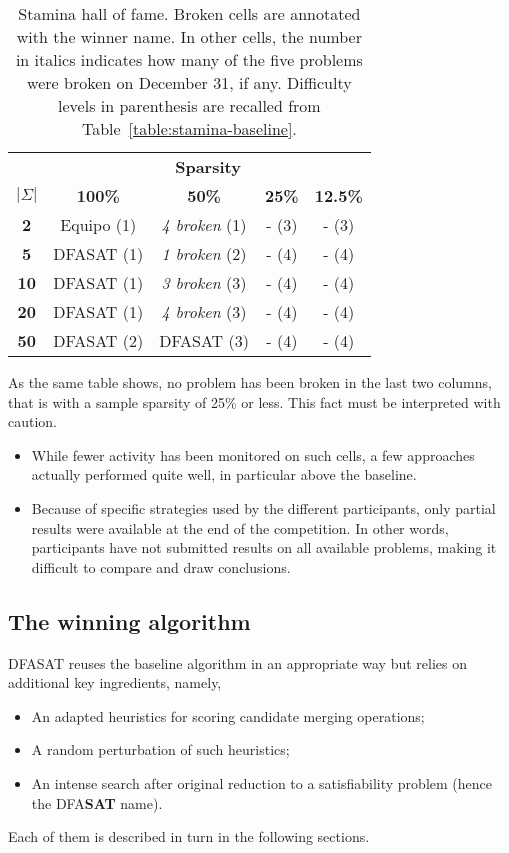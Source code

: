 \begin{table}
\begin{center}
\begin{tabular}{c|c c c c}
&\multicolumn{4}{|c}{\textbf{Sparsity}}\\ 
\textbf{$|\Sigma|$} & \textbf{100\%} & \textbf{50\%} & \textbf{25\%} & \textbf{12.5\%}\\
\hline
\textbf{2}  & Equipo (1) & \emph{4 broken} (1)  & - (3) & - (3) \\
\textbf{5}  & DFASAT (1) & \emph{1 broken} (2)  & - (4) & - (4) \\
\textbf{10} & DFASAT (1) & \emph{3 broken} (3)  & - (4) & - (4) \\
\textbf{20} & DFASAT (1) & \emph{4 broken} (3)  & - (4) & - (4) \\
\textbf{50} & DFASAT (2) & DFASAT (3) & - (4) & - (4) \\
\end{tabular}
\end{center}
\caption{Stamina hall of fame. Broken cells are annotated with the winner name. In other cells, the number in italics indicates how many of the five problems were broken on December 31, if any. Difficulty levels in parenthesis are recalled from Table~\ref{table:stamina-baseline}.\label{table:stamina-hall-of-fame}}
\end{table}

As the same table shows, no problem has been broken in the last two columns, that is with a sample sparsity of 25\% or less. This fact must be interpreted with caution. 
\begin{itemize}
\item While fewer activity has been monitored on such cells, a few approaches actually performed quite well, in particular above the baseline. 
\item Because of specific strategies used by the different participants, only partial results were available at the end of the competition. In other words, participants have not submitted results on all available problems, making it difficult to compare and draw conclusions.
\end{itemize}

\subsection{The winning algorithm\label{subsection:stamina-winning}}

DFASAT reuses the baseline algorithm in an appropriate way but relies on additional key ingredients, namely,
\begin{itemize}
\item An adapted heuristics for scoring candidate merging operations;
\item A random perturbation of such heuristics;
\item An intense search after original reduction to a satisfiability problem (hence the DFA\textbf{SAT} name). 
\end{itemize}
Each of them is described in turn in the following sections.

